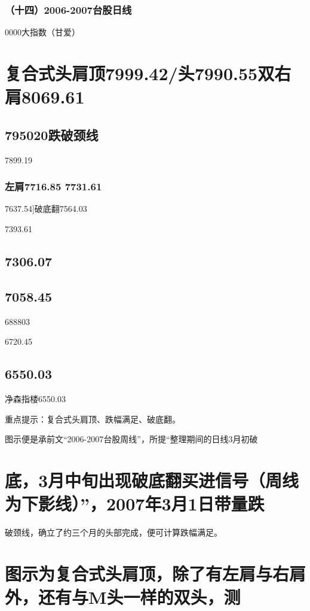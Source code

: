 \documentclass{article}
\begin{document}
\subsubsection{（十四）2006-2007台股日线}

0000大指数（甘爱）

\section{复合式头肩顶7999.42/头7990.55双右肩8069.61}

\subsection{795020跌破颈线}

7899.19

\subsubsection{左肩7716.85 7731.61}

7637.54]破底翻7564.03

7393.61

\subsection{7306.07}

\subsection{7058.45}

688803

6720.45

\subsection{6550.03}

净森指楼6550.03

重点提示：复合式头肩顶、跌幅满足、破底翻。

图示便是承前文“2006-2007台股周线”，所提“整理期间的日线3月初破

\section{底，3月中旬出现破底翻买进信号（周线为下影线）”，2007年3月1日带量跌}

破颈线，确立了约三个月的头部完成，便可计算跌幅满足。

\section{图示为复合式头肩顶，除了有左肩与右肩外，还有与M头一样的双头，测}
\end{document}
